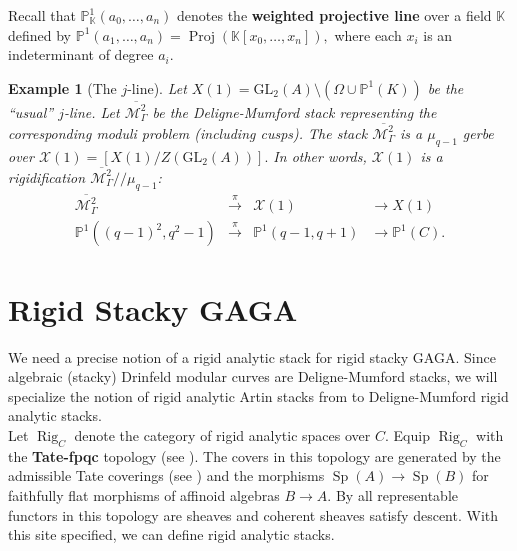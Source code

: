 \documentclass[11pt]{amsart}
\newtheorem{example}[theorem]{Example}
\newtheorem{remark}[theorem]{Remark}
\theoremstyle{definition}
\numberwithin{equation}{section}
\newcommand{\Proj}{\operatorname{Proj}} 	%
\newcommand{\GL}{\mathrm{GL}} 	%
\newcommand{\cM}{\mathcal{M}}		%
\newcommand{\sX}{\mathscr{X}}		%
\newcommand{\bbF}{\mathbb{F}}		%
\newcommand{\bbK}{\mathbb{K}}		%
\newcommand{\bbP}{\mathbb{P}}		%
\begin{document}
		Recall that $\bbP_{\bbK}^1(a_0,\ldots, a_n)$ denotes the \textbf{weighted projective line} over a field $\bbK$ defined by $\displaystyle{\bbP^1(a_1,\ldots, a_n)=\Proj(\bbK[x_0,\ldots, x_n])},$ where each $x_i$ is an indeterminant of degree $a_i.$
		
		\begin{example}[The $j$-line]
			Let $X(1)=\GL_2(A)\setminus(\Omega\cup\bbP^1(K))$ be the ``usual'' $j$-line. Let $\overline{\cM^2_{\Gamma}}$ be the Deligne-Mumford stack representing the corresponding moduli problem (including cusps). The stack $\overline{\cM^2_{\Gamma}}$ is a $\mu_{q-1}$ gerbe over $\sX(1)=[X(1)/Z(\GL_2(A))].$ In other words, $\sX(1)$ is a rigidification $\overline{\cM^2_{\Gamma}}/\!/\mu_{q-1}$: 
			\[\begin{array}{cccl}
				\overline{\cM^2_{\Gamma}}&\overset{\pi}{\to}&\sX(1)&\to X(1)\\
				\bbP^1((q-1)^2,q^2-1)&\overset{\pi}{\to}&\bbP^1(q-1,q+1)&\to\bbP^1(C).
			\end{array}\]
		\end{example}
		
		
		\section{Rigid Stacky GAGA}
		
		We need a precise notion of a rigid analytic stack for rigid stacky GAGA. Since algebraic (stacky) Drinfeld modular curves are Deligne-Mumford stacks, we will specialize the notion of rigid analytic Artin stacks from \cite[Section $5.1.7$]{Emerton-Gee-Hellman-categorical-p-adic-langlands} to Deligne-Mumford rigid analytic stacks.\\
		
		Let $\operatorname{Rig}_C$ denote the category of rigid analytic spaces over $C.$ Equip $\operatorname{Rig}_C$ with the \textbf{Tate-fpqc} topology (see \cite[$2.1$]{Conrad-Temkin-nonarhimedean-analytification-alg-spaces}). The covers in this topology are generated by the admissible Tate coverings (see \cite[Section $4.2$]{Frensel-vanderPut-Rigid-Analytic_Geom}) and the morphisms $\operatorname{Sp}(A)\to \operatorname{Sp}(B)$ for faithfully flat morphisms of affinoid algebras $B\to A.$ By \cite[Theorem $4.2.8$]{Conrad-ampleness-rigid-geom} all representable functors in this topology are sheaves and coherent sheaves satisfy descent. With this site specified, we can define rigid analytic stacks.
		
\end{document}

